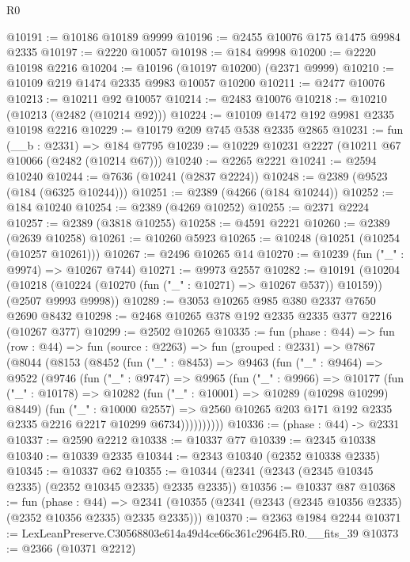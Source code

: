 \begin{lexlean}{R0}
\begin{coremodule}
@10191 := @10186 @10189 @9999
@10196 := @2455 @10076 @175 @1475 @9984 @2335
@10197 := @2220 @10057
@10198 := @184 @9998
@10200 := @2220 @10198 @2216
@10204 := @10196 (@10197 @10200) (@2371 @9999)
@10210 := @10109 @219 @1474 @2335 @9983 @10057 @10200
@10211 := @2477 @10076
@10213 := @10211 @92 @10057
@10214 := @2483 @10076
@10218 := @10210 (@10213 (@2482 (@10214 @92)))
@10224 := @10109 @1472 @192 @9981 @2335 @10198 @2216
@10229 := @10179 @209 @745 @538 @2335 @2865
@10231 := fun (__b : @2331) => @184 @7795
@10239 := @10229 @10231 @2227 (@10211 @67 @10066 (@2482 (@10214 @67)))
@10240 := @2265 @2221
@10241 := @2594 @10240
@10244 := @7636 (@10241 (@2837 @2224))
@10248 := @2389 (@9523 (@184 (@6325 @10244)))
@10251 := @2389 (@4266 (@184 @10244))
@10252 := @184 @10240
@10254 := @2389 (@4269 @10252)
@10255 := @2371 @2224
@10257 := @2389 (@3818 @10255)
@10258 := @4591 @2221
@10260 := @2389 (@2639 @10258)
@10261 := @10260 @5923
@10265 := @10248 (@10251 (@10254 (@10257 @10261)))
@10267 := @2496 @10265 @14
@10270 := @10239 (fun ("_" : @9974) => @10267 @744)
@10271 := @9973 @2557
@10282 := @10191
    (@10204
      (@10218 (@10224 (@10270 (fun ("_" : @10271) => @10267 @537)) @10159))
      (@2507 @9993 @9998))
@10289 := @3053 @10265 @985 @380 @2337 @7650 @2690 @8432
@10298 := @2468 @10265 @378 @192 @2335 @2335 @377 @2216 (@10267 @377)
@10299 := @2502 @10265
@10335 := fun (phase : @44) =>
  fun (row : @44) =>
  fun (source : @2263) =>
  fun (grouped : @2331) =>
  @7867
    (@8044
      (@8153
        (@8452
          (fun ("_" : @8453) =>
          @9463
            (fun ("_" : @9464) =>
            @9522
              (@9746
                (fun ("_" : @9747) =>
                @9965
                  (fun ("_" : @9966) =>
                  @10177
                    (fun ("_" : @10178) =>
                    @10282
                      (fun ("_" : @10001) => @10289 (@10298 @10299) @8449)
                      (fun ("_" : @10000 @2557) =>
                      @2560 @10265 @203 @171 @192 @2335 @2335 @2216 @2217 @10299 @6734))))))))))
@10336 := (phase : @44) -> @2331
@10337 := @2590 @2212
@10338 := @10337 @77
@10339 := @2345 @10338
@10340 := @10339 @2335
@10344 := @2343 @10340 (@2352 @10338 @2335)
@10345 := @10337 @62
@10355 := @10344 (@2341 (@2343 (@2345 @10345 @2335) (@2352 @10345 @2335) @2335 @2335))
@10356 := @10337 @87
@10368 := fun (phase : @44) =>
  @2341 (@10355 (@2341 (@2343 (@2345 @10356 @2335) (@2352 @10356 @2335) @2335 @2335)))
@10370 := @2363 @1984 @2244
@10371 := LexLeanPreserve.C30568803e614a49d4ce66c361c2964f5.R0.__fits_39
@10373 := @2366 (@10371 @2212)

\end{coremodule}
\end{lexlean}
